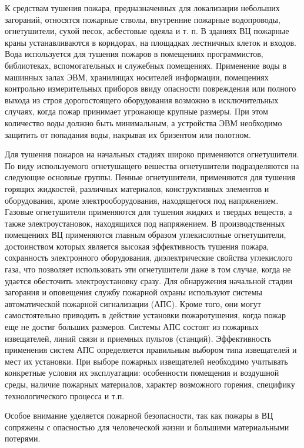 К средствам тушения пожара, предназначенных для локализации небольших загораний, относятся пожарные стволы,
внутренние пожарные водопроводы, огнетушители, сухой песок, асбестовые одеяла и т. п. В зданиях ВЦ пожарные
краны устанавливаются в коридорах, на площадках лестничных клеток и входов. Вода используется для тушения пожаров
в помещениях программистов, библиотеках, вспомогательных и служебных помещениях. Применение воды в машинных залах
ЭВМ, хранилищах носителей информации, помещениях контрольно измерительных приборов ввиду опасности повреждения или
полного выхода из строя дорогостоящего оборудования возможно в исключительных случаях, когда пожар принимает
угрожающе крупные размеры. При этом количество воды должно быть минимальным, а устройства ЭВМ необходимо защитить
от попадания воды, накрывая их бризентом или полотном.

Для тушения пожаров на начальных стадиях широко применяются огнетушители. По виду используемого огнетушащего
вешества огнетушители подразделяются на следующие основные группы. Пенные огнетушители, применяются для тушения
горящих жидкостей, различных материалов, конструктивных элементов и оборудования, кроме электрооборудования,
находящегося под напряжением. Газовые огнетушители применяются для тушения жидких и твердых веществ, а также
электроустановок, находящихся под напряжением. В производственных помещениях ВЦ применяются главным образом
углекислотные огнетушители, достоинством которых является высокая эффективность тушения пожара, сохранность
электронного оборудования, диэлектрические свойства углекислого газа, что позволяет использовать эти огнетушители
даже в том случае, когда не удается обесточить электроустановку сразу. Для обнаружения начальной стадии
загорания и оповещения службу пожарной охраны используют системы автоматической пожарной сигнализации (АПС).
Кроме того, они могут самостоятельно приводить в действие установки пожаротушения, когда пожар еще не достиг
больших размеров. Системы АПС состоят из пожарных извещателей, линий связи и приемных пультов (станций).
Эффективность применения систем АПС определяется правильным выбором типа извещателей и мест их установки.
При выборе пожарных извещателей необходимо учитывать конкретные условия их эксплуатации: особенности помещения и
воздушной среды, наличие пожарных материалов, характер возможного горения, специфику технологического процесса и т.п.

Особое внимание уделяется пожарной безопасности, так как пожары в ВЦ сопряжены с опасностью для человеческой
жизни и большими материальными потерями.

